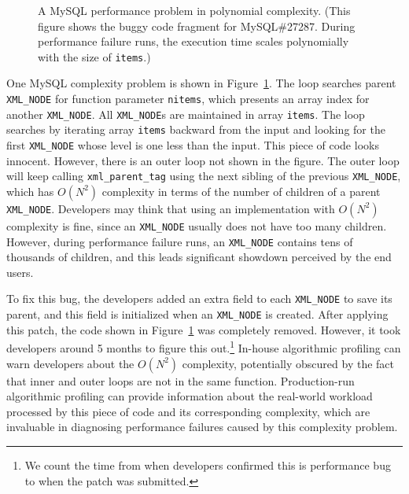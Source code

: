 \begin{figure}
\centering
{}
  \mbox{}
  \vspace{-0.1in}
\caption{A MySQL performance problem in polynomial complexity. 
\footnotesize{(This figure shows the buggy code fragment for MySQL\#27287. 
   During performance failure runs, 
   the execution time scales polynomially with the size of \texttt{items}.)}}
\vspace{-0.05in}
\label{fig:mysql27287}
\vspace{-0.15in}
\end{figure}


One MySQL complexity problem is shown in Figure~\ref{fig:mysql27287}.
The loop searches parent \texttt{XML\_NODE} for function parameter \texttt{nitems}, 
which presents an array index for another \texttt{XML\_NODE}.
All \texttt{XML\_NODE}s are maintained in array \texttt{items}. 
The loop searches by iterating array \texttt{items} 
backward from the input and looking for the first \texttt{XML\_NODE} 
whose level is one less than the input.
This piece of code looks innocent. 
However, there is an outer loop not shown in the figure.
The outer loop will keep calling \texttt{xml\_parent\_tag} using 
the next sibling of the previous \texttt{XML\_NODE}, 
which has $O(N^2)$ complexity in terms of the number of children of a parent \texttt{XML\_NODE}. 
Developers may think that using an implementation with $O(N^2)$ complexity is fine, 
since an \texttt{XML\_NODE} usually does not have too many children.
However, during performance failure runs, 
an \texttt{XML\_NODE} contains tens of thousands of children, 
and this leads significant showdown perceived by the end users. 

To fix this bug, the developers added an extra field to each \texttt{XML\_NODE} to save its parent, 
and this field is initialized when an \texttt{XML\_NODE} is created. 
After applying this patch, the code shown in Figure~\ref{fig:mysql27287} was completely removed.
However, it took developers around 5 months to figure this  
out.\footnote{We count the time from when developers confirmed this is performance bug 
to when the patch was submitted.} 
In-house algorithmic profiling can warn developers about the $O(N^2)$ complexity, 
potentially obscured by the fact that inner and outer loops are not in the same function. 
Production-run algorithmic profiling can provide information about the real-world workload 
processed by this piece of code and its corresponding complexity,
which are invaluable in diagnosing performance failures caused by this complexity problem. 



